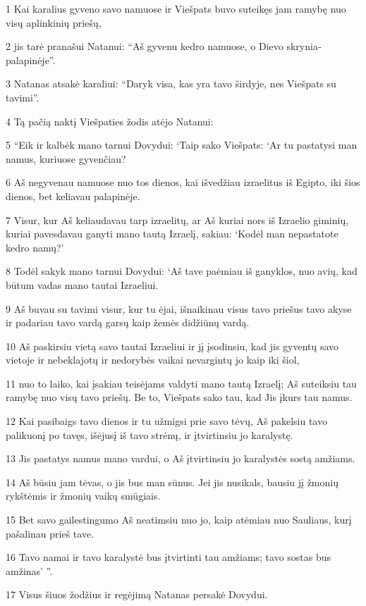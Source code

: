 \par 1 Kai karalius gyveno savo namuose ir Viešpats buvo suteikęs jam ramybę nuo visų aplinkinių priešų, 
\par 2 jis tarė pranašui Natanui: “Aš gyvenu kedro namuose, o Dievo skrynia­ palapinėje”. 
\par 3 Natanas atsakė karaliui: “Daryk visa, kas yra tavo širdyje, nes Viešpats su tavimi”. 
\par 4 Tą pačią naktį Viešpaties žodis atėjo Natanui: 
\par 5 “Eik ir kalbėk mano tarnui Dovydui: ‘Taip sako Viešpats: ‘Ar tu pastatysi man namus, kuriuose gyvenčiau? 
\par 6 Aš negyvenau namuose nuo tos dienos, kai išvedžiau izraelitus iš Egipto, iki šios dienos, bet keliavau palapinėje. 
\par 7 Visur, kur Aš keliaudavau tarp izraelitų, ar Aš kuriai nors iš Izraelio giminių, kuriai pavesdavau ganyti mano tautą Izraelį, sakiau: ‘Kodėl man nepastatote kedro namų?’ 
\par 8 Todėl sakyk mano tarnui Dovydui: ‘Aš tave paėmiau iš ganyklos, nuo avių, kad būtum vadas mano tautai Izraeliui. 
\par 9 Aš buvau su tavimi visur, kur tu ėjai, išnaikinau visus tavo priešus tavo akyse ir padariau tavo vardą garsų kaip žemės didžiūnų vardą. 
\par 10 Aš paskirsiu vietą savo tautai Izraeliui ir jį įsodinsiu, kad jis gyventų savo vietoje ir nebeklajotų ir nedorybės vaikai nevargintų jo kaip iki šiol, 
\par 11 nuo to laiko, kai įsakiau teisėjams valdyti mano tautą Izraelį; Aš suteiksiu tau ramybę nuo visų tavo priešų. Be to, Viešpats sako tau, kad Jis įkurs tau namus. 
\par 12 Kai pasibaigs tavo dienos ir tu užmigsi prie savo tėvų, Aš pakelsiu tavo palikuonį po tavęs, išėjusį iš tavo strėnų, ir įtvirtinsiu jo karalystę. 
\par 13 Jis pastatys namus mano vardui, o Aš įtvirtinsiu jo karalystės sostą amžiams. 
\par 14 Aš būsiu jam tėvas, o jis bus man sūnus. Jei jis nusikals, bausiu jį žmonių rykštėmis ir žmonių vaikų smūgiais. 
\par 15 Bet savo gailestingumo Aš neatimsiu nuo jo, kaip atėmiau nuo Sauliaus, kurį pašalinau prieš tave. 
\par 16 Tavo namai ir tavo karalystė bus įtvirtinti tau amžiams; tavo sostas bus amžinas’ ”. 
\par 17 Visus šiuos žodžius ir regėjimą Natanas persakė Dovydui. 
